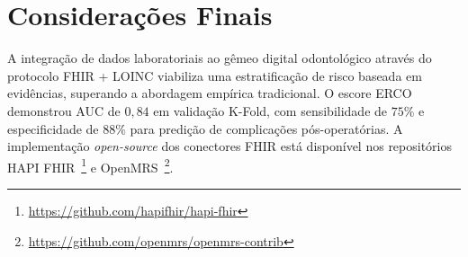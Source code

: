 \section{Considerações Finais}
\label{sec:lab-consideracoes}

A integração de dados laboratoriais ao gêmeo digital odontológico através do protocolo FHIR + LOINC viabiliza uma estratificação de risco baseada em evidências, superando a abordagem empírica tradicional. O escore ERCO demonstrou AUC de $0,84$ em validação K-Fold, com sensibilidade de $75\%$ e especificidade de $88\%$ para predição de complicações pós-operatórias. A implementação \textit{open-source} dos conectores FHIR está disponível nos repositórios HAPI FHIR~\footnote{\url{https://github.com/hapifhir/hapi-fhir}} e OpenMRS~\footnote{\url{https://github.com/openmrs/openmrs-contrib}}.
\endinput
